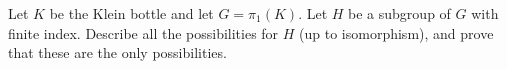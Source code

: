 Let $K$ be the Klein bottle and let $G=\pi_1(K)$. Let $H$ be a
subgroup of $G$ with finite index. Describe all the possibilities for
$H$ (up to isomorphism), and prove that these are the only
possibilities.
